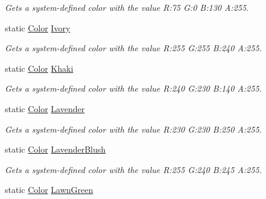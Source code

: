 \begin{DoxyCompactItemize}
\begin{DoxyCompactList}\small\item\em Gets a system-\/defined color with the value R\+:75 G\+:0 B\+:130 A\+:255.\end{DoxyCompactList}\item 
static \hyperlink{structMicrosoft_1_1Xna_1_1Framework_1_1Color}{Color} \hyperlink{structMicrosoft_1_1Xna_1_1Framework_1_1Color_a022d2aa712eea8feb51479b13d63b171}{Ivory}
\begin{DoxyCompactList}\small\item\em Gets a system-\/defined color with the value R\+:255 G\+:255 B\+:240 A\+:255.\end{DoxyCompactList}\item 
static \hyperlink{structMicrosoft_1_1Xna_1_1Framework_1_1Color}{Color} \hyperlink{structMicrosoft_1_1Xna_1_1Framework_1_1Color_a2bf6d2259705f4c708f15c9665ce4475}{Khaki}
\begin{DoxyCompactList}\small\item\em Gets a system-\/defined color with the value R\+:240 G\+:230 B\+:140 A\+:255.\end{DoxyCompactList}\item 
static \hyperlink{structMicrosoft_1_1Xna_1_1Framework_1_1Color}{Color} \hyperlink{structMicrosoft_1_1Xna_1_1Framework_1_1Color_abae8947ec0f84c73eb5efd0e960e590a}{Lavender}
\begin{DoxyCompactList}\small\item\em Gets a system-\/defined color with the value R\+:230 G\+:230 B\+:250 A\+:255.\end{DoxyCompactList}\item 
static \hyperlink{structMicrosoft_1_1Xna_1_1Framework_1_1Color}{Color} \hyperlink{structMicrosoft_1_1Xna_1_1Framework_1_1Color_a687b15806e8ae291e6743de27841b7b6}{Lavender\+Blush}
\begin{DoxyCompactList}\small\item\em Gets a system-\/defined color with the value R\+:255 G\+:240 B\+:245 A\+:255.\end{DoxyCompactList}\item 
static \hyperlink{structMicrosoft_1_1Xna_1_1Framework_1_1Color}{Color} \hyperlink{structMicrosoft_1_1Xna_1_1Framework_1_1Color_a15de0e383f225ec93280545331558ba9}{Lawn\+Green}

\end{DoxyCompactItemize}
